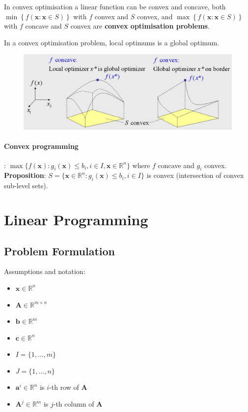 \documentclass[11pt]{article}
\begin{document}
\noindent
In convex optimisation a linear function can be convex and concave, both $\min\left\{ f(\textbf{x}:\textbf{x}\in S) \right\}$ with $f$ convex and $S$ convex, and $\max\left\{ f(\textbf{x}:\textbf{x}\in S) \right\}$ with $f$ concave and $S$ convex are \textbf{convex optimisation problems}.
\begin{theorem}
	In a convex optimisation problem, local optimums is a global optimum.
\end{theorem}

\begin{figure}[H]
	\centering
	\includegraphics[width=0.7\linewidth, keepaspectratio]{convex_optimisation}
	\label{fig:convexoptimisation}
\end{figure}

\paragraph{Convex programming}: $\max\{ f(\textbf{x}):g_i (\textbf{x})\leq b_i , i\in I, \textbf{x} \in \mathbb{R}^n \}$ where $f$ concave and $g_i$ convex.\\
\textbf{Proposition}: $S = \{ \textbf{x}\in\mathbb{R}^n :g_i (\textbf{x})\leq b_i ,i\in I \}$ is convex (intersection of convex sub-level sets).

\section{Linear Programming}
\subsection{Problem Formulation}
Assumptions and notation:

\begin{itemize}[label=-,noitemsep,nosep]
	\item $\textbf{x}\in\mathbb{R}^n$
	\item $ \textbf{A}\in\mathbb{R}^{m\times n} $
	\item $ \textbf{b}\in\mathbb{R}^m $
	\item $ \textbf{c}\in\mathbb{R}^n $
	\item $ I = \{1,\dots,m\} $
	\item $ J = \{1,\dots,n\} $
	\item $ \textbf{a}^i\in\mathbb{R}^n $ is $i$-th row of $\textbf{A}$
	\item $ \textbf{A}^j\in\mathbb{R}^m $ is $j$-th column of $\textbf{A}$
\end{itemize}
\end{document}

